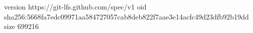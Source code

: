 version https://git-lfs.github.com/spec/v1
oid sha256:5668fa7edc09971aa584727057cab8deb822f7aae3e14acfc49d23dfb92b19dd
size 699216
